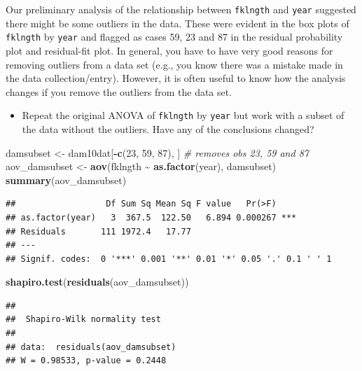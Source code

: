 \documentclass[
  12pt,
]{book}
\newenvironment{Shaded}{\begin{snugshade}}{\end{snugshade}}
\newcommand{\CommentTok}[1]{\textcolor[rgb]{0.56,0.35,0.01}{\textit{#1}}}
\newcommand{\DecValTok}[1]{\textcolor[rgb]{0.00,0.00,0.81}{#1}}
\newcommand{\KeywordTok}[1]{\textcolor[rgb]{0.13,0.29,0.53}{\textbf{#1}}}
\newcommand{\NormalTok}[1]{#1}
\newcommand{\OperatorTok}[1]{\textcolor[rgb]{0.81,0.36,0.00}{\textbf{#1}}}
\newcommand{\StringTok}[1]{\textcolor[rgb]{0.31,0.60,0.02}{#1}}
\providecommand{\tightlist}{%
  \setlength{\itemsep}{0pt}\setlength{\parskip}{0pt}}
\begin{document}
Our preliminary analysis of the relationship between \texttt{fklngth} and \texttt{year} suggested there might be some outliers in the data. These were evident in the box plots of \texttt{fklngth} by \texttt{year} and flagged as cases 59, 23 and 87 in the residual probability plot and residual-fit plot. In general, you have to have very good reasons for removing outliers from a data set (e.g., you know there was a mistake made in the data collection/entry). However, it is often useful to know how the analysis changes if you remove the outliers from the data set.

\begin{itemize}
\tightlist
\item
  Repeat the original ANOVA of \texttt{fklngth} by \texttt{year} but work with a subset of the data without the outliers. Have any of the conclusions changed?
\end{itemize}

\begin{Shaded}
\begin{Highlighting}[]
\NormalTok{damsubset \textless{}{-}}\StringTok{ }\NormalTok{dam10dat[}\OperatorTok{{-}}\KeywordTok{c}\NormalTok{(}\DecValTok{23}\NormalTok{, }\DecValTok{59}\NormalTok{, }\DecValTok{87}\NormalTok{), ] }\CommentTok{\# removes obs 23, 59 and 87}
\NormalTok{aov\_damsubset \textless{}{-}}\StringTok{ }\KeywordTok{aov}\NormalTok{(fklngth }\OperatorTok{\textasciitilde{}}\StringTok{ }\KeywordTok{as.factor}\NormalTok{(year), damsubset)}
\KeywordTok{summary}\NormalTok{(aov\_damsubset)}
\end{Highlighting}
\end{Shaded}

\begin{verbatim}
##                  Df Sum Sq Mean Sq F value   Pr(>F)    
## as.factor(year)   3  367.5  122.50   6.894 0.000267 ***
## Residuals       111 1972.4   17.77                     
## ---
## Signif. codes:  0 '***' 0.001 '**' 0.01 '*' 0.05 '.' 0.1 ' ' 1
\end{verbatim}

\begin{Shaded}
\begin{Highlighting}[]
\KeywordTok{shapiro.test}\NormalTok{(}\KeywordTok{residuals}\NormalTok{(aov\_damsubset))}
\end{Highlighting}
\end{Shaded}

\begin{verbatim}
## 
##  Shapiro-Wilk normality test
## 
## data:  residuals(aov_damsubset)
## W = 0.98533, p-value = 0.2448
\end{verbatim}
\end{document}
